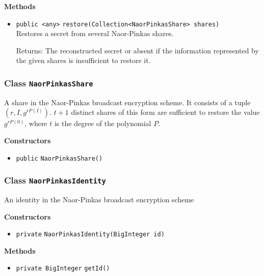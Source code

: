 \textbf{Methods}
\begin{itemize}
\item \lstinline|public <any>| \lstinline|restore|\lstinline|(Collection<NaorPinkasShare> shares)|\\
Restores a secret from several Naor-Pinkas shares.

Returns: The reconstructed secret or absent if the information represented
 by the given shares is insufficient to restore it.

\end{itemize}

\subsubsection{Class \lstinline|NaorPinkasShare|}
A share in the Naor-Pinkas broadcast encryption scheme. It consists of a tuple
 $(r, I, g^{r P(I)})$. $t + 1$ distinct shares of this form are sufficient to restore the
 value $g^{r P(0)}$, where $t$ is the degree of the polynomial $P$. \\





\textbf{Constructors}
\begin{itemize}
\item \lstinline|public| \lstinline|NaorPinkasShare|\lstinline|()|




\end{itemize}


\subsubsection{Class \lstinline|NaorPinkasIdentity|}
An identity in the Naor-Pinkas broadcast encryption scheme \\





\textbf{Constructors}
\begin{itemize}
\item \lstinline|private| \lstinline|NaorPinkasIdentity|\lstinline|(BigInteger id)|




\end{itemize}


\textbf{Methods}
\begin{itemize}
\item \lstinline|private BigInteger| \lstinline|getId|\lstinline|()|




\end{itemize}


